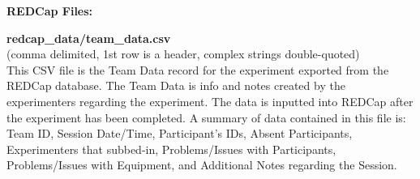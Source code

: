 \begin{description}
\item\textbf{REDCap Files:}
\medskip
\item\textbf{redcap\_data/team\_data.csv}\\(comma delimited, 1st row is a header, complex strings double-quoted)\\
This CSV file is the Team Data record for the experiment exported from the REDCap database. The Team Data is info and notes created by the experimenters regarding the experiment. The data is inputted into REDCap after the experiment has been completed. A summary of data contained in this file is: Team ID, Session Date/Time, Participant's IDs, Absent Participants, Experimenters that subbed-in, Problems/Issues with Participants, Problems/Issues with Equipment, and Additional Notes regarding the Session.


\end{description}
